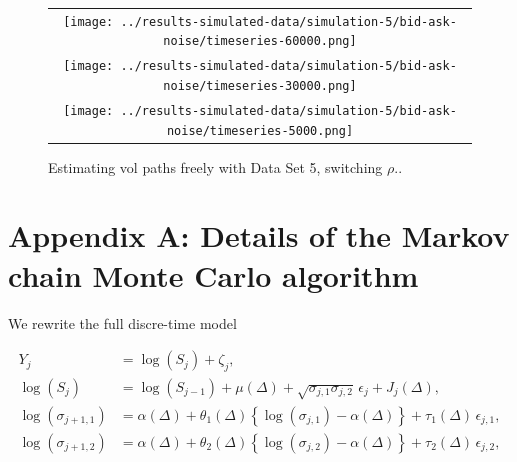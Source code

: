\documentclass[10pt]{article}
\begin{document}
\begin{figure}
  \centering
  \begin{tabular}{c}
    \begin{minipage}{0.80\textwidth}
      \centering
      \texttt{[image: ../results-simulated-data/simulation-5/bid-ask-noise/timeseries-60000.png]}
    \end{minipage} \\
    \begin{minipage}{0.80\textwidth}
      \centering
      \texttt{[image: ../results-simulated-data/simulation-5/bid-ask-noise/timeseries-30000.png]}
    \end{minipage} \\
    \begin{minipage}{0.80\textwidth}
      \centering
      \texttt{[image: ../results-simulated-data/simulation-5/bid-ask-noise/timeseries-5000.png]}
    \end{minipage}
  \end{tabular}
  \caption{Estimating vol paths freely with Data Set 5, switching $\rho$..}
\end{figure}

\appendix
\section*{Appendix A: Details of the Markov chain Monte Carlo algorithm}\label{ap:mcmc}
We rewrite the full discre-time model

\begin{align}
  Y_j &= \log(S_j) + \zeta_j  ,   \nonumber \\
  \log(S_{j}) &= \log(S_{j-1}) + \mu(\Delta) + \sqrt{\sigma_{j,1}\sigma_{j,2}} \, \epsilon_{j} + J_j(\Delta)   ,  \label{eq:mod2-appendix} \\
  \log(\sigma_{j+1,1}) &= \alpha(\Delta) + \theta_1(\Delta) \left\{ \log(\sigma_{j,1}) - \alpha(\Delta) \right\} + \tau_1(\Delta) \, \epsilon_{j,1}    ,  \nonumber \\
  \log(\sigma_{j+1,2}) &= \alpha(\Delta) + \theta_2(\Delta) \left\{ \log(\sigma_{j,2}) - \alpha(\Delta) \right\} + \tau_2(\Delta) \, \epsilon_{j,2}    , \nonumber
\end{align}
\end{document}
